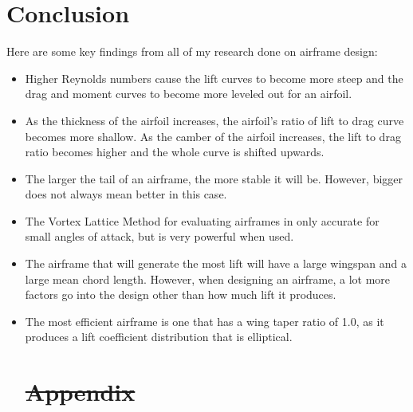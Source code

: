 \documentclass{journal}
\providecommand{\DIFdel}[1]{{\protect\color{red}\sout{#1}}}                      %
\providecommand{\DIFdelbegin}{} %
\newcommand{\DIFscaledelfig}{0.5}
\newlength{\DIFdelgraphicswidth} %
\newlength{\DIFdelgraphicsheight} %
\newcommand{\DIFdelincludegraphics}[2][]{%
\sbox{\DIFdelgraphicsbox}{\DIFOincludegraphics[#1]{#2}}%
\settoboxwidth{\DIFdelgraphicswidth}{\DIFdelgraphicsbox} %
\settoboxtotalheight{\DIFdelgraphicsheight}{\DIFdelgraphicsbox} %
\scalebox{\DIFscaledelfig}{%
\parbox[b]{\DIFdelgraphicswidth}{\usebox{\DIFdelgraphicsbox}\\[-\baselineskip] \rule{\DIFdelgraphicswidth}{0em}}\llap{\resizebox{\DIFdelgraphicswidth}{\DIFdelgraphicsheight}{%
\setlength{\unitlength}{\DIFdelgraphicswidth}%
\begin{picture}(1,1)%
\thicklines\linethickness{2pt} %
{\color[rgb]{1,0,0}\put(0,0){\framebox(1,1){}}}%
{\color[rgb]{1,0,0}\put(0,0){\line( 1,1){1}}}%
{\color[rgb]{1,0,0}\put(0,1){\line(1,-1){1}}}%
\end{picture}%
}\hspace*{3pt}}} %
} %
\DeclareRobustCommand{\DIFdelbegin}{\DIFOdelbegin \let\includegraphics\DIFdelincludegraphics} %
\begin{document}
	\section{Conclusion}
	Here are some key findings from all of my research done on airframe design:
	 \begin{itemize}
	 	\item Higher Reynolds numbers cause the lift curves to become more steep and the drag and moment curves to become more leveled out for an airfoil.
	 	\item As the thickness of the airfoil increases, the airfoil's ratio of lift to drag curve becomes more shallow. As the camber of the airfoil increases, the lift to drag ratio becomes higher and the whole curve is shifted upwards. 
	 	\item The larger the tail of an airframe, the more stable it will be. However, bigger does not always mean better in this case.
	 	\item The Vortex Lattice Method for evaluating airframes in only accurate for small angles of attack, but is very powerful when used.
	 	\item The airframe that will generate the most lift will have a large wingspan and a large mean chord length. However, when designing an airframe, a lot more factors go into the design other than how much lift it produces.
	 	\item The most efficient airframe is one that has a wing taper ratio of 1.0, as it produces a lift coefficient distribution that is elliptical.
	 \DIFdelbegin %


\section{\DIFdel{Appendix}}
\addtocounter{section}{-1}%


\end{itemize}
\end{document}
